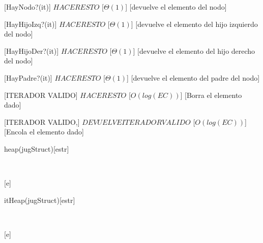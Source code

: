 \begin{Interfaz}
  [HayNodo?(it)]
  {$HACER ESTO$}
  [$\Theta(1)$]
  [devuelve el elemento del nodo]
  
  [HayHijoIzq?(it)]
  {$HACER ESTO$}
  [$\Theta(1)$]
  [devuelve el elemento del hijo izquierdo del nodo]
  
  [HayHijoDer?(it)]
  {$HACER ESTO$}
  [$\Theta(1)$]
  [devuelve el elemento del hijo derecho del nodo]
  
  [HayPadre?(it)]
  {$HACER ESTO$}
  [$\Theta(1)$]
  [devuelve el elemento del padre del nodo]
  
  [ITERADOR VALIDO]
  {$HACER ESTO$}
  [$O(log(EC))$]
  [Borra el elemento dado]
  
  [ITERADOR VALIDO,]
  {$DEVUELVE ITERADOR VALIDO$}
  [$O(log(EC))$]
  [Encola el elemento dado]


\end{Interfaz}

\begin{Representacion}
 
  \begin{Estructura}{heap(jugStruct)}[estr]
      \begin{Tupla}[estr]%
    \end{Tupla}
  \end{Estructura}

	\begin{Tupla}[Nodoheap]
	\end{Tupla}


  ~

  [e]{}

\end{Representacion}

\begin{Representacion}
 
  \begin{Estructura}{itHeap(jugStruct)}[estr]
      \begin{Tupla}[estr]%
    \end{Tupla}
  \end{Estructura}


  ~

  [e]{}

\end{Representacion}



